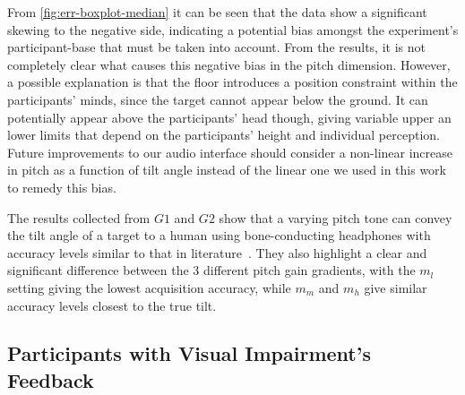 \documentclass[sigconf, screen=true, anonymous=true]{acmart}
\begin{document}

From \cref{fig:err-boxplot-median} it can be seen that the data show a significant skewing to the negative side, indicating a potential bias amongst the experiment's participant-base that must be taken into account.
From the results, it is not completely clear what causes this negative bias in the pitch dimension.
However, a possible explanation is that the floor introduces a position constraint within the participants' minds, since the target cannot appear below the ground.
It can potentially appear above the participants' head though, giving variable upper an lower limits that depend on the participants' height and individual perception.
Future improvements to our audio interface should consider a non-linear increase in pitch as a function of tilt angle instead of the linear one we used in this work to remedy this bias.

The results collected from $G1$ and $G2$ show that a varying pitch tone can convey the tilt angle of a target to a human using bone-conducting headphones with accuracy levels similar to that in literature~\cite{bujacz2011sonification, katz2011spatial, zotkin2004rendering}.
They also highlight a clear and significant difference between the 3 different pitch gain gradients, with the $m_l$ setting giving the lowest acquisition accuracy, while $m_m$ and $m_h$ give similar accuracy levels closest to the true tilt. 

\subsection{Participants with Visual Impairment's Feedback}
\end{document}
